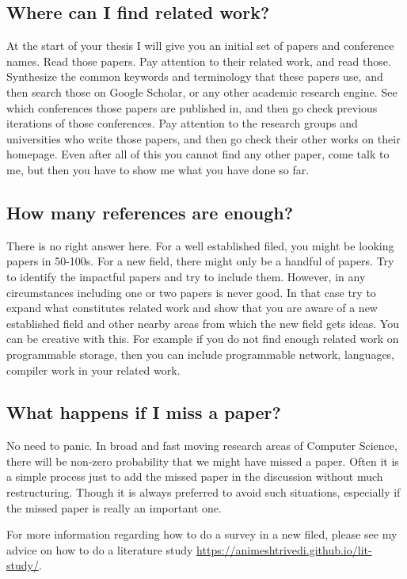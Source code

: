 \documentclass{article}
\begin{document}
\subsection*{Where can I find related work?}
At the start of your thesis I will give you an initial set of papers and conference names. Read those papers. Pay attention to their related work, and read those. Synthesize the common keywords and terminology that these papers use, and then search those on Google Scholar, or any other academic research engine. See which conferences those papers are published in, and then go check previous iterations of those conferences. Pay attention to the research groups and universities who write those papers, and then go check their other works on their homepage. Even after all of this you cannot find any other paper, come talk to me, but then you have to show me what you have done so far. 

\subsection*{How many references are enough?}
There is no right answer here. For a well established filed, you might be looking papers in 50-100s. For a new field, there might only be a handful of papers. Try to identify the impactful papers and try to include them. However, in any circumstances including one or two papers is never good. In that case try to expand what constitutes related work and show that you are aware of a new established field and other nearby areas from which the new field gets ideas. You can be creative with this. For example if you do not find enough related work on programmable storage, then you can include programmable network, languages, compiler work in your related work. 


\subsection*{What happens if I miss a paper?}
No need to panic. In broad and fast moving research areas of Computer Science, there will be non-zero probability that we might have missed a paper. Often it is a simple process just to add the missed paper in the discussion without much restructuring. Though it is always preferred to avoid such situations, especially if the missed paper is really an important one. 

For more information regarding how to do a survey in a new filed, please see my advice on how to do a literature study \url{https://animeshtrivedi.github.io/lit-study/}. 
\end{document}
